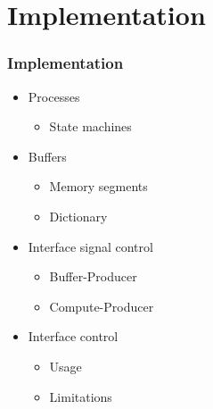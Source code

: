 \section{Implementation}
\newcommand{\ImplementationTitle}{Implementation}
\begin{frame}
    \frametitle{\ImplementationTitle}
    \centering
    \begin{minipage}{1\textwidth}
        \begin{itemize}%
            \item Processes
            \begin{itemize}
                \item State machines
            \end{itemize}
            \item Buffers
            \begin{itemize}
                \item Memory segments
                \item Dictionary
            \end{itemize}
            \item Interface signal control
            \begin{itemize}
                \item Buffer-Producer
                \item Compute-Producer
            \end{itemize}
            \item Interface control
            \begin{itemize}
                \item Usage
                \item Limitations
            \end{itemize}
        \end{itemize}
    \end{minipage}
\end{frame}


